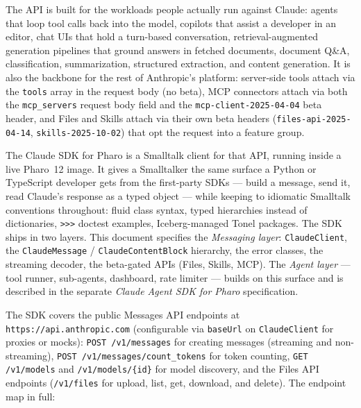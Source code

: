 \documentclass[a4paper,10pt,fleqn]{article}
\begin{document}
The API is built for the workloads people actually run against
Claude: agents that loop tool calls back into the model, copilots
that assist a developer in an editor, chat UIs that hold a
turn-based conversation, retrieval-augmented generation pipelines
that ground answers in fetched documents, document Q\&A,
classification, summarization, structured extraction, and content
generation.  It is also the backbone for the rest of Anthropic's
platform: server-side tools attach via the \texttt{tools} array
in the request body (no beta), MCP connectors attach via both the
\texttt{mcp\_servers} request body field and the
\texttt{mcp-client-2025-04-04} beta header, and Files and Skills
attach via their own beta headers (\texttt{files-api-2025-04-14},
\texttt{skills-2025-10-02}) that opt the request into a feature group.

The Claude SDK for Pharo is a Smalltalk client for
that API, running inside a live Pharo~12 image.  It
gives a Smalltalker the same surface a Python or TypeScript developer
gets from the first-party SDKs --- build a message, send it, read
Claude's response as a typed object --- while keeping to idiomatic
Smalltalk conventions throughout: fluid class syntax, typed hierarchies
instead of dictionaries, \texttt{>>>} doctest examples, Iceberg-managed
Tonel packages.  The SDK ships in two layers.  This document specifies
the \emph{Messaging layer}: \texttt{ClaudeClient}, the
\texttt{ClaudeMessage} / \texttt{ClaudeContentBlock} hierarchy, the
error classes, the streaming decoder, the beta-gated APIs (Files,
Skills, MCP).  The \emph{Agent layer} --- tool runner, sub-agents,
dashboard, rate limiter --- builds on this surface and is described in
the separate \emph{Claude Agent SDK for Pharo} specification.

The SDK covers the public Messages API endpoints at
\texttt{https://api.anthropic.com} (configurable via \texttt{baseUrl}
on \texttt{ClaudeClient} for proxies or mocks): \texttt{POST
/v1/messages} for creating messages (streaming and non-streaming),
\texttt{POST /v1/messages/count\_tokens} for token counting,
\texttt{GET /v1/models} and \texttt{/v1/models/\{id\}} for model
discovery, and the Files API endpoints (\texttt{/v1/files} for upload,
list, get, download, and delete).  The endpoint map in full:
\end{document}
